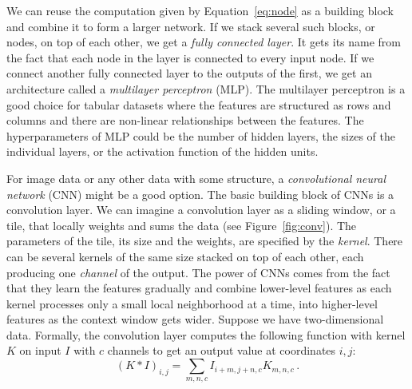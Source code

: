 
We can reuse the computation given by Equation~\ref{eq:node} as a building block and combine it to form a larger network. If we stack several such blocks, or nodes, on top of each other, we get a \textit{fully connected layer}. It gets its name from the fact that each node in the layer is connected to every input node. If we connect another fully connected layer to the outputs of the first, we get an architecture called a \textit{multilayer perceptron} (MLP). The multilayer perceptron is a good choice for tabular datasets where the features are structured as rows and columns and there are non-linear relationships between the features. The hyperparameters of MLP could be the number of hidden layers, the sizes of the individual layers, or the activation function of the hidden units.

For image data or any other data with some structure, a \textit{convolutional neural network} (CNN) might be a good option. The basic building block of CNNs is a convolution layer. We can imagine a convolution layer as a sliding window, or a tile, that locally weights and sums the data (see Figure~\ref{fig:conv}). The parameters of the tile, its size and the weights, are specified by the \textit{kernel}. There can be several kernels of the same size stacked on top of each other, each producing one \textit{channel} of the output. The power of CNNs comes from the fact that they learn the features gradually and combine lower-level features as each kernel processes only a small local neighborhood at a time, into higher-level features as the context window gets wider. Suppose we have two-dimensional data. Formally, the convolution layer computes the following function with kernel $K$ on input $I$ with $c$ channels to get an output value at coordinates $i,j$:
\[
 (K \ast I)_{i,j} =\sum_{m,n,c} I_{i+m,j+n,c}K_{m,n,c}\,.
\]

